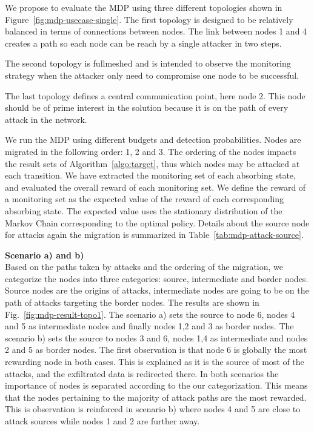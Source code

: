 We propose to evaluate the MDP using three different topologies shown in Figure~\ref{fig:mdp-usecase-single}. The first topology is designed to be relatively balanced in terms of connections between nodes. The link between nodes 1 and 4 creates a path so each node can be reach by a single attacker in two steps.

The second topology is fullmeshed and is intended to observe the monitoring strategy when the attacker only need to compromise one node to be successful.

 The last topology defines a central communication point, here node 2. This node should be of prime interest in the solution because it is on the path of every attack in the network.



We run the MDP using different budgets and detection probabilities.
Nodes are migrated in the following order: 1, 2 and 3.
The ordering of the nodes impacts the result sets of Algorithm~\ref{algo:target}, thus which nodes may be attacked at each transition.
We have extracted the monitoring set of each absorbing state, and evaluated the overall reward of each monitoring set.
We define the reward of a monitoring set as the expected value of the reward of each corresponding absorbing state.
The expected value uses the stationary distribution of the Markov Chain corresponding to the optimal policy.
Details about the source node for attacks again the migration is summarized in Table~\ref{tab:mdp-attack-source}.



\textbf{Scenario a) and b)\\}
Based on the paths taken by attacks and the ordering of the migration, we categorize the nodes into three categories: source, intermediate and border nodes. Source nodes are the origins of attacks, intermediate nodes are going to be on the path of attacks targeting the border nodes. 
The results are shown in Fig.~\ref{fig:mdp-result-topo1}.
The scenario a) sets the source to node 6, nodes 4 and 5 as intermediate nodes and finally nodes 1,2 and 3 as border nodes.
The scenario b) sets the source to nodes 3 and 6, nodes 1,4 as intermediate and nodes 2 and 5 as border nodes.
The first observation is that node 6 is globally the most rewarding node in both cases.
This is explained as it is the source of most of the attacks, and the exfiltrated data is redirected there.
In both scenarios the importance of nodes is separated according to the our categorization. 
This means that the nodes pertaining to the majority of attack paths are the most rewarded.
This is observation is reinforced in scenario b) where nodes 4 and 5 are close to attack sources while nodes 1 and 2 are further away.

